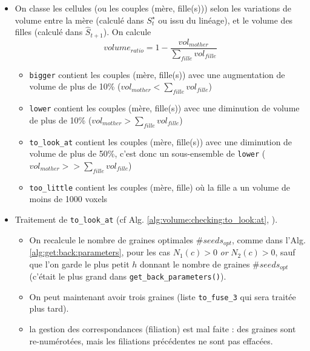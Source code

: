 \documentclass{article}
\begin{document}
\begin{itemize}
\begin{itemize}
\begin{itemize}

\item On classe les cellules (ou les couples (m\`ere, fille(s))) selon les variations de volume entre la m\`ere (calcul\'e dans $S^{\star}_t$ ou issu du lin\'eage), et le volume des filles (calcul\'e dans $\hat{S}_{t+1}$).
On calcule 
\begin{displaymath}
volume_{ratio} = 1 - \frac{vol_{mother}}{\sum_{fille} vol_{fille}}
\end{displaymath}

\begin{itemize}
\item \verb|bigger| contient les couples (m\`ere, fille(s)) avec une augmentation de volume de plus de 10\% ($vol_{mother} < \sum_{fille} vol_{fille}$)
\item \verb|lower| contient les couples (m\`ere, fille(s)) avec une diminution de volume de plus de 10\% ($vol_{mother} > \sum_{fille} vol_{fille}$)
\item \verb|to_look_at| contient les couples (m\`ere, fille(s)) avec une diminution de volume de plus de 50\%, c'est donc un sous-ensemble de \verb|lower| ($vol_{mother} >> \sum_{fille} vol_{fille}$)
\item \verb|too_little| contient les couples (m\`ere, fille) o\`u la fille a un volume de moins de 1000 voxels
\end{itemize}

\item Traitement de \verb|to_look_at| (cf Alg. \ref{alg:volume:checking:to_look:at}, \cite[point (1), section 2.3.3.6, page 73]{guignard:tel-01278725}).

\begin{itemize}
\item On recalcule le nombre de graines optimales $\# seeds_{opt} $, comme dans l'Alg. \ref{alg:get:back:parameters}, 
pour les cas  $N_1(c) > 0$ \textit{or} $N_2(c) > 0$, sauf que l'on garde le plus petit $h$ donnant le nombre de graines  $\# seeds_{opt} $ (c'\'etait le plus grand dans \texttt{get\_back\_parameters()}).
\item On peut maintenant avoir trois graines (liste \verb|to_fuse_3| qui sera trait\'ee plus tard).
\item la gestion des correspondances (filiation) est mal faite : des graines sont re-num\'erot\'ees, mais les filiations pr\'ec\'edentes ne sont pas effac\'ees.
\end{itemize}


\end{itemize}
\end{itemize}
\end{itemize}
\end{document}

